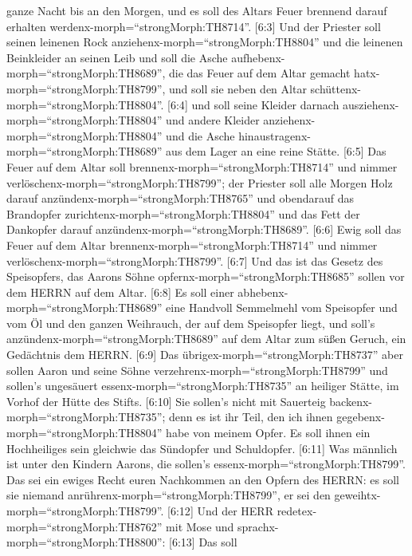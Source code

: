 ganze Nacht bis an den Morgen, und es soll des Altars Feuer brennend
darauf erhalten werdenx-morph=``strongMorph:TH8714''. 
{[}6:3{]} Und der Priester soll seinen leinenen Rock
anziehenx-morph=``strongMorph:TH8804'' und die leinenen Beinkleider an
seinen Leib und soll die Asche aufhebenx-morph=``strongMorph:TH8689'',
die das Feuer auf dem Altar gemacht hatx-morph=``strongMorph:TH8799'',
und soll sie neben den Altar schüttenx-morph=``strongMorph:TH8804''.
 {[}6:4{]} und soll seine Kleider darnach
ausziehenx-morph=``strongMorph:TH8804'' und andere Kleider
anziehenx-morph=``strongMorph:TH8804'' und die Asche
hinaustragenx-morph=``strongMorph:TH8689'' aus dem Lager an eine reine
Stätte.  {[}6:5{]} Das Feuer auf dem Altar soll
brennenx-morph=``strongMorph:TH8714'' und nimmer
verlöschenx-morph=``strongMorph:TH8799''; der Priester soll alle Morgen
Holz darauf anzündenx-morph=``strongMorph:TH8765'' und obendarauf das
Brandopfer zurichtenx-morph=``strongMorph:TH8804'' und das Fett der
Dankopfer darauf anzündenx-morph=``strongMorph:TH8689''. 
{[}6:6{]} Ewig soll das Feuer auf dem Altar
brennenx-morph=``strongMorph:TH8714'' und nimmer
verlöschenx-morph=``strongMorph:TH8799''.  {[}6:7{]} Und
das ist das Gesetz des Speisopfers, das Aarons Söhne
opfernx-morph=``strongMorph:TH8685'' sollen vor dem HERRN auf dem Altar.
 {[}6:8{]} Es soll einer
abhebenx-morph=``strongMorph:TH8689'' eine Handvoll Semmelmehl vom
Speisopfer und vom Öl und den ganzen Weihrauch, der auf dem Speisopfer
liegt, und soll's anzündenx-morph=``strongMorph:TH8689'' auf dem Altar
zum süßen Geruch, ein Gedächtnis dem HERRN.  {[}6:9{]} Das
übrigex-morph=``strongMorph:TH8737'' aber sollen Aaron und seine Söhne
verzehrenx-morph=``strongMorph:TH8799'' und sollen's ungesäuert
essenx-morph=``strongMorph:TH8735'' an heiliger Stätte, im Vorhof der
Hütte des Stifts.  {[}6:10{]} Sie sollen's nicht mit
Sauerteig backenx-morph=``strongMorph:TH8735''; denn es ist ihr Teil,
den ich ihnen gegebenx-morph=``strongMorph:TH8804'' habe von meinem
Opfer. Es soll ihnen ein Hochheiliges sein gleichwie das Sündopfer und
Schuldopfer.  {[}6:11{]} Was männlich ist unter den Kindern
Aarons, die sollen's essenx-morph=``strongMorph:TH8799''. Das sei ein
ewiges Recht euren Nachkommen an den Opfern des HERRN: es soll sie
niemand anrührenx-morph=``strongMorph:TH8799'', er sei den
geweihtx-morph=``strongMorph:TH8799''.  {[}6:12{]} Und der
HERR redetex-morph=``strongMorph:TH8762'' mit Mose und
sprachx-morph=``strongMorph:TH8800'':  {[}6:13{]} Das soll
